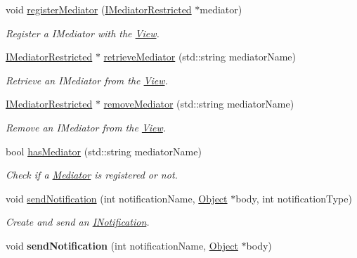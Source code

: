 \begin{DoxyCompactItemize}
void \hyperlink{class_pure_m_v_c_1_1_facade_a3c0ead374ba222146a7fe5a59eb0fcb4}{registerMediator} (\hyperlink{class_pure_m_v_c_1_1_i_mediator_restricted}{IMediatorRestricted} $\ast$mediator)
\begin{DoxyCompactList}\small\item\em Register a {\ttfamily IMediator} with the {\ttfamily \hyperlink{class_pure_m_v_c_1_1_view}{View}}. \item\end{DoxyCompactList}\item 
\hyperlink{class_pure_m_v_c_1_1_i_mediator_restricted}{IMediatorRestricted} $\ast$ \hyperlink{class_pure_m_v_c_1_1_facade_a4e821a5fcc6c2fa509742e88ca43dd2d}{retrieveMediator} (std::string mediatorName)
\begin{DoxyCompactList}\small\item\em Retrieve an {\ttfamily IMediator} from the {\ttfamily \hyperlink{class_pure_m_v_c_1_1_view}{View}}. \item\end{DoxyCompactList}\item 
\hyperlink{class_pure_m_v_c_1_1_i_mediator_restricted}{IMediatorRestricted} $\ast$ \hyperlink{class_pure_m_v_c_1_1_facade_a0ddae3c399fc7cb393596f8b13792790}{removeMediator} (std::string mediatorName)
\begin{DoxyCompactList}\small\item\em Remove an {\ttfamily IMediator} from the {\ttfamily \hyperlink{class_pure_m_v_c_1_1_view}{View}}. \item\end{DoxyCompactList}\item 
bool \hyperlink{class_pure_m_v_c_1_1_facade_a214c067f65fabe53634541f531b41609}{hasMediator} (std::string mediatorName)
\begin{DoxyCompactList}\small\item\em Check if a \hyperlink{class_pure_m_v_c_1_1_mediator}{Mediator} is registered or not. \item\end{DoxyCompactList}\item 
void \hyperlink{class_pure_m_v_c_1_1_facade_a39a61e0a65d0f979848d36fe99cfd5f5}{sendNotification} (int notificationName, \hyperlink{class_pure_m_v_c_1_1_object}{Object} $\ast$body, int notificationType)
\begin{DoxyCompactList}\small\item\em Create and send an {\ttfamily \hyperlink{class_pure_m_v_c_1_1_i_notification}{INotification}}. \item\end{DoxyCompactList}\item 
\hypertarget{class_pure_m_v_c_1_1_facade_ad9078471e3f54d555b208d5121664503}{
void {\bfseries sendNotification} (int notificationName, \hyperlink{class_pure_m_v_c_1_1_object}{Object} $\ast$body)}
\label{class_pure_m_v_c_1_1_facade_ad9078471e3f54d555b208d5121664503}


\end{DoxyCompactItemize}
